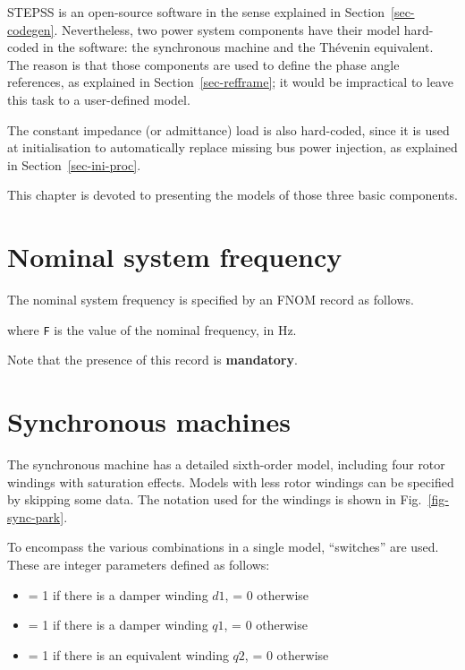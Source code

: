 STEPSS is an open-source software in the sense explained in Section~\ref{sec-codegen}. Nevertheless, two power system components have their model hard-coded in the software: the synchronous machine and the Th\'{e}venin equivalent. The reason is that those components are used to define the phase angle references, as explained in Section~\ref{sec-refframe}; it would be impractical to leave this task to a user-defined model.

The constant impedance (or admittance) load is also hard-coded, since it is used at initialisation to automatically replace missing bus power injection, as explained in Section~\ref{sec-ini-proc}.

This chapter is devoted to presenting the models of those three basic components.

\section{Nominal system frequency}

The nominal system frequency is specified by an FNOM record as follows.

\hspace*{5ex}{\tt FNOM F ;}

where {\tt F} is the value of the nominal frequency, in Hz.

Note that the presence of this record is {\bf mandatory}.

\section{Synchronous machines}

The synchronous machine has a detailed sixth-order model, including four rotor windings with saturation effects. Models with less rotor windings can be specified by skipping some data. The notation used for the windings is shown in Fig.~\ref{fig-sync-park}.

To encompass the various combinations in a single model, ``switches'' are used. These are integer parameters defined as follows:
\begin{itemize}
\item[$S_{d1}$] = 1 if there is a damper winding $d1$, = 0 otherwise
\item[$S_{q1}$] = 1 if there is a damper winding $q1$, = 0 otherwise
\item[$S_{q2}$] = 1 if there is an equivalent winding $q2$, = 0 otherwise
\end{itemize}

